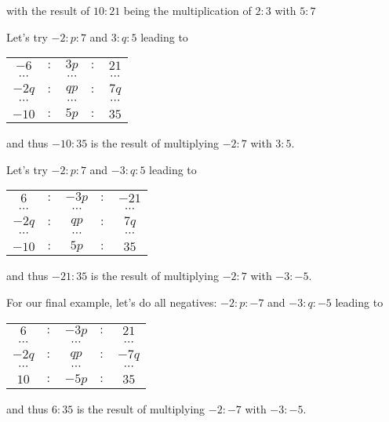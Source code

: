 \documentclass[12pt]{article}
\theoremstyle{remark}
\begin{document}
\begin{enumerate}
    with the result of $10:21$ being the multiplication of $2:3$ with $5:7$
    
    Let's try $-2 : p : 7$ and $3: q : 5$ leading to
    
     \begin{tabular}{ccccc}
        $-6$ &$:$& $3p$ &$:$& $21$ \\
        $\cdots$ & & $\cdots$ & & $\cdots$ \\
        $-2q$ &$:$& $qp$ &$:$& $7q$\\
        $\cdots$ & & $\cdots$ & & $\cdots$ \\
         $-10$ &$:$& $5p$&$:$& $35$
    \end{tabular}
    
    and thus $-10:35$ is the result of multiplying $-2:7$ with $3:5$.

    Let's try $-2 : p : 7$ and $-3: q : 5$ leading to
    
     \begin{tabular}{ccccc}
        $6$ &$:$& $-3p$ &$:$& $-21$ \\
        $\cdots$ & & $\cdots$ & & $\cdots$ \\
        $-2q$ &$:$& $qp$ &$:$& $7q$\\
        $\cdots$ & & $\cdots$ & & $\cdots$ \\
         $-10$ &$:$& $5p$&$:$& $35$
    \end{tabular}
    
    and thus $-21:35$ is the result of multiplying $-2:7$ with $-3:-5$.

    For our final example, let's do all negatives: $-2 : p : -7$ and $-3: q : -5$ leading to
    
     \begin{tabular}{ccccc}
        $6$ &$:$& $-3p$ &$:$& $21$ \\
        $\cdots$ & & $\cdots$ & & $\cdots$ \\
        $-2q$ &$:$& $qp$ &$:$& $-7q$\\
        $\cdots$ & & $\cdots$ & & $\cdots$ \\
         $10$ &$:$& $-5p$&$:$& $35$
    \end{tabular}
    
    and thus $6:35$ is the result of multiplying $-2:-7$ with $-3:-5$.
    

\end{enumerate}
\end{document}
